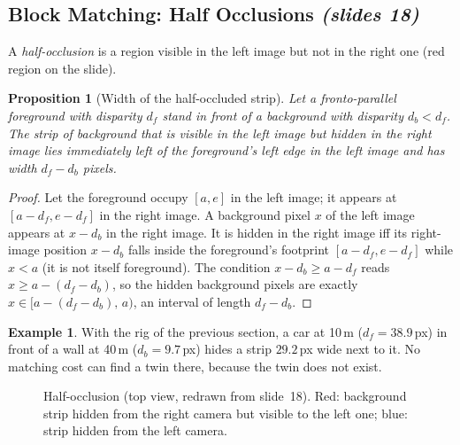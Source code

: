 \documentclass[11pt,a4paper]{article}
\newcommand{\slr}[1]{\texorpdfstring{\emph{(slides #1)}}{(slides #1)}}
\theoremstyle{definition}
\newtheorem{example}[definition]{Example}
\theoremstyle{plain}
\newtheorem{proposition}[definition]{Proposition}
\theoremstyle{remark}
\begin{document}
\subsection{Block Matching: Half Occlusions \slr{18}}
A \emph{half-occlusion} is a region visible in the left image but not in the right one (red region on the slide).
\begin{proposition}[Width of the half-occluded strip]
Let a fronto-parallel foreground with disparity $d_f$ stand in front of a background with disparity $d_b<d_f$. The strip of background that is visible in the left image but hidden in the right image lies immediately left of the foreground's left edge in the left image and has width $d_f-d_b$ pixels.
\end{proposition}
\begin{proof}
Let the foreground occupy $[a,e]$ in the left image; it appears at $[a-d_f,e-d_f]$ in the right image. A background pixel $x$ of the left image appears at $x-d_b$ in the right image. It is hidden in the right image iff its right-image position $x-d_b$ falls inside the foreground's footprint $[a-d_f,e-d_f]$ while $x<a$ (it is not itself foreground). The condition $x-d_b\ge a-d_f$ reads $x\ge a-(d_f-d_b)$, so the hidden background pixels are exactly $x\in[a-(d_f-d_b),\,a)$, an interval of length $d_f-d_b$.
\end{proof}
\begin{example}
With the rig of the previous section, a car at 10\,m ($d_f=38.9$\,px) in front of a wall at 40\,m ($d_b=9.7$\,px) hides a strip $29.2$\,px wide next to it. No matching cost can find a twin there, because the twin does not exist.
\end{example}
\begin{figure}[H]\centering
{}
\caption{Half-occlusion (top view, redrawn from slide~18). Red: background strip hidden from the right camera but visible to the left one; blue: strip hidden from the left camera.}
\end{figure}
\end{document}
